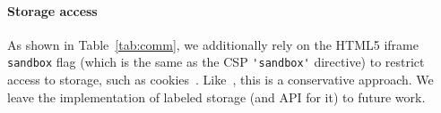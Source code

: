 \paragraph{Storage access}
As shown in Table~\ref{tab:comm}, we additionally rely on the HTML5
iframe \verb|sandbox| flag (which is the same as the CSP
\verb|'sandbox'| directive) to restrict access to storage, such as cookies~\cite{html5}.
%
%
Like~\cite{Akhawe2013}, this is a conservative approach.
%
We leave the implementation of labeled storage (and API for it) to
future work.


%
%
%
%
%

